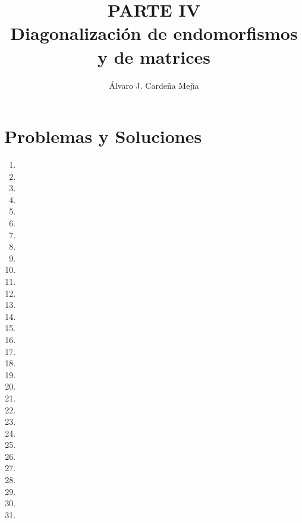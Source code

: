 \documentclass[a4paper,11pt]{article}
\title{PARTE IV\\Diagonalizaci\'on de endomorfismos y de matrices}
\author{\'Alvaro J. Carde\~na Mej\'{\i}a}
\theoremstyle{teoremas}
\theoremstyle{ejemplos}
\theoremstyle{definiciones}
\theoremstyle{lemas}
\begin{document}
\maketitle

\section{Problemas y Soluciones}

\begin{enumerate}
 \item  %
 \item 
 \item 
 \item 
 \item 
 \item 
 \item 
 \item 
 \item 
 \item 
 \item 
 \item 
 \item 
 \item 
 \item 
 \item 
 \item 
 \item 
 \item 
 \item 
 \item 
 \item 
 \item 
 \item 
 \item 
 \item 
 \item 
 \item 
 \item 
 \item 
 \item 
\end{enumerate}
\end{document}
